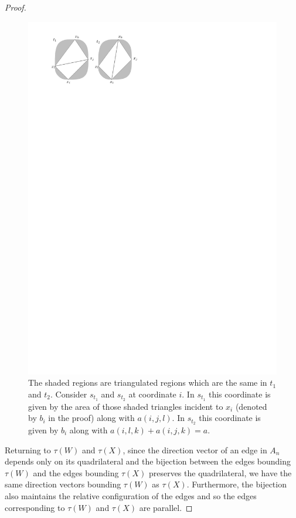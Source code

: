 \documentclass[11pt]{article}
\theoremstyle{remark}
\theoremstyle{definition}
\begin{document}
\begin{proof}
\begin{figure}
\includegraphics{triangulate} 
\caption{The shaded regions are triangulated regions which are the same in $t_1$ and $t_2$.  Consider $s_{t_1}$ and $s_{t_2}$ at coordinate $i$.  In $s_{t_1}$ this coordinate is given by the area of those shaded triangles incident to $x_i$ (denoted by $b_i$ in the proof) along with $a(i,j,l)$.  In $s_{t_2}$ this coordinate is given by $b_i$ along with $a(i,l,k) + a(i,j,k) = a$.}\label{triangulate}
\end{figure}

Returning to $\tau(W)$ and $\tau(X)$, since the direction vector of an edge in $A_n$ depends only on its quadrilateral and the bijection between the edges bounding $\tau(W)$ and the edges bounding $\tau(X)$ preserves the quadrilateral, we have the same direction vectors bounding $\tau(W)$ as $\tau(X)$.  Furthermore, the bijection also maintains the relative configuration of the edges and so the edges corresponding to $\tau(W)$ and $\tau(X)$ are parallel.
\end{proof}
\end{document}
